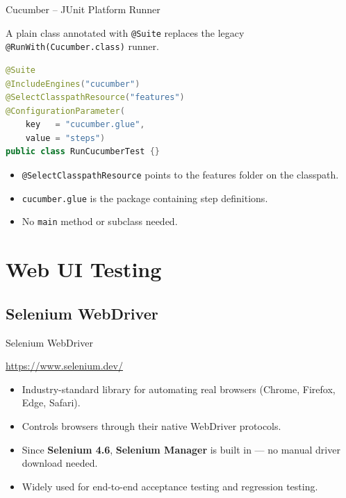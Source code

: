 \documentclass[11pt, xcolor=svgnames]{beamer}
\providecommand{\alert}[1]{\textbf{#1}}
\begin{document}
\begin{frame}[fragile]{Cucumber -- JUnit Platform Runner}

A plain class annotated with \texttt{@Suite} replaces the legacy \texttt{@RunWith(Cucumber.class)} runner.

\begin{lstlisting}[language=Java,basicstyle=\scriptsize]
@Suite
@IncludeEngines("cucumber")
@SelectClasspathResource("features")
@ConfigurationParameter(
    key   = "cucumber.glue",
    value = "steps")
public class RunCucumberTest {}
\end{lstlisting}

\begin{itemize}
  \item \texttt{@SelectClasspathResource} points to the features folder on the classpath.
  \item \texttt{cucumber.glue} is the package containing step definitions.
  \item No \texttt{main} method or subclass needed.
\end{itemize}

\end{frame}



\section{Web UI Testing}


\subsection{Selenium WebDriver}


\begin{frame}{Selenium WebDriver}

\begin{block}{}
  \centering \url{https://www.selenium.dev/}
\end{block}

\begin{itemize}
  \item Industry-standard library for automating real browsers (Chrome, Firefox, Edge, Safari).
  \item Controls browsers through their native WebDriver protocols.
  \item Since \textbf{Selenium 4.6}, \alert{Selenium Manager} is built in --- no manual driver download needed.
  \item Widely used for end-to-end acceptance testing and regression testing.
\end{itemize}

\end{frame}
\end{document}
